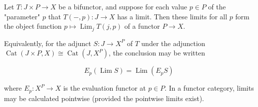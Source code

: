 Let $T : J \times P \rightarrow X$ be a bifunctor, and suppose for each value $p \in P$ of the "parameter" $p$ that $T(-, p) : J \rightarrow X$ has a limit. Then these limits for all $p$ form the object function $p \mapsto \operatorname{Lim}_j T(j, p)$ of a functor $P \rightarrow X$.

Equivalently, for the adjunct $S : J \rightarrow X^P$ of $T$ under the adjunction $\operatorname{Cat}(J \times P, X) \cong \operatorname{Cat}(J, X^P)$, the conclusion may be written

$$E_p(\operatorname{Lim} S) = \operatorname{Lim}(E_p S)$$

where $E_p : X^P \rightarrow X$ is the evaluation functor at $p \in P$. In a functor category, limits may be calculated pointwise (provided the pointwise limits exist).
